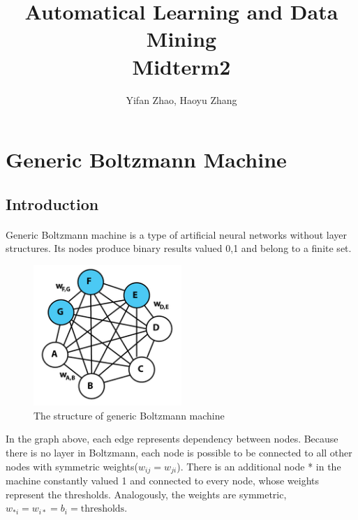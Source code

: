 \documentclass{article}
\author{Yifan Zhao, Haoyu Zhang}
\title{Automatical Learning and Data Mining\\Midterm2}
\begin{document}
 \maketitle

 \section{Generic Boltzmann Machine}
 \subsection{Introduction}
\paragraph{}
Generic Boltzmann machine is a type of artificial neural networks without layer structures. Its nodes produce binary results valued {0,1} and belong to a finite set.
\begin{figure}[H]
 \centering
 \includegraphics[width=0.5\textwidth]{Boltzmannexample.jpg}
 \caption{The structure of generic Boltzmann machine}\label{}
 \end{figure}
In the graph above, each edge represents dependency between nodes. Because there is no layer in Boltzmann, each node is possible to be connected to all other nodes with symmetric weights($w_{ij}=w_{ji}$). There is an additional node * in the machine constantly valued 1 and connected to every node, whose weights represent the thresholds. Analogously, the weights are symmetric, $w_{*i}=w_{i*}=b_{i}=\text{thresholds}$.
\end{document}
